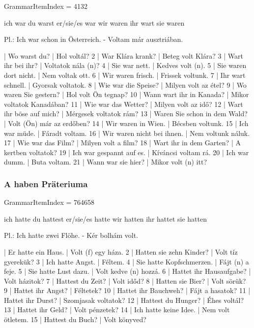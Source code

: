 \documentclass{article}
\newenvironment{desc}{\verbatim}{\endverbatim}
\newenvironment{exmp}{\verbatim}{\endverbatim}
\begin{document}
GrammarItemIndex = 4132

\begin{desc}
ich war
du warst
er/sie/es war
wir waren
ihr wart
sie waren

Pl.: Ich war schon in Österreich. - Voltam már ausztriában.
\end{desc}

\begin{exmp}
1 | Wo warst du? | Hol voltál?
2 | War Klára krank? | Beteg volt Klára?
3 | Wart ihr bei ihr? | Voltatok nála (n)?
4 | Sie war nett. | Kedves volt (n).
5 | Sie waren dort nicht. | Nem voltak ott.
6 | Wir waren frisch. | Frissek voltunk.
7 | Ihr wart schnell. | Gyorsak voltatok.
8 | Wie war die Speise? | Milyen volt az étel?
9 | Wo waren Sie gestern? | Hol volt Ön tegnap?
10 | Wann wart ihr in Kanada? | Mikor voltatok Kanadában?
11 | Wie war das Wetter? | Milyen volt az idő?
12 | Wart ihr böse auf mich? | Mérgesek voltatok rám?
13 | Waren Sie schon in dem Wald? | Volt (Ön) már az erdőben?
14 | Wir waren in Wien. | Bécsben voltunk.
15 | Ich war müde. | Fáradt voltam.
16 | Wir waren nicht bei ihnen. | Nem voltunk náluk.
17 | Wie war das Film? | Milyen volt a film?
18 | Wart ihr in dem Garten? | A kertben voltatok?
19 | Ich war gespannt auf es. | Kíváncsi voltam rá.
20 | Ich war dumm. | Buta voltam.
21 | Wann war sie hier? | Mikor volt (n) itt?
\end{exmp}

\subsubsection{A haben Präteriuma}

GrammarItemIndex = 764658

\begin{desc}
ich hatte
du hattest
er/sie/es hatte
wir hatten
ihr hattet
sie hatten

Pl.: Ich hatte zwei Flöhe. - Kér bolhám volt.
\end{desc}

\begin{exmp}
1 | Er hatte ein Haus. | Volt (f) egy háza.
2 | Hatten sie zehn Kinder? | Volt tíz gyerekük?
3 | Ich hatte Angst. | Féltem.
4 | Sie hatte Kopfschmerzen. | Fájt (n) a feje.
5 | Sie hatte Lust dazu. | Volt kedve (n) hozzá.
6 | Hattet ihr Hausaufgabe? | Volt házitok?
7 | Hattest du Zeit? | Volt időd?
8 | Hatten sie Bier? | Volt sörük?
9 | Hattet ihr Angst? | Féltetek?
10 | Hattet ihr Bauchweh? | Fájt a hasatok?
11 | Hattet ihr Durst? | Szomjasak voltatok?
12 | Hattest du Hunger? | Éhes voltál?
13 | Hattet ihr Geld? | Volt pénzetek?
14 | Ich hatte keine Idee. | Nem volt ötletem.
15 | Hattest du Buch? | Volt könyved?
\end{exmp}
\end{document}
